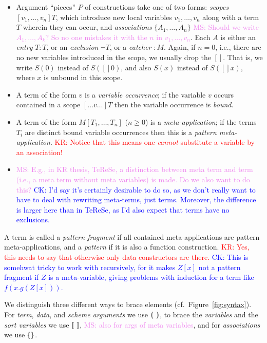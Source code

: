 \documentclass[letterpaper,11pt]{article}
\newcommand{\CK}[1]{\textcolor{blue}{CK: #1}}
\newcommand{\KR}[1]{\textcolor{red}{KR: #1}}
\newcommand{\MS}[1]{\textcolor{violet}{MS: #1}}
\begin{document}
\begin{definition}
\begin{itemize}
  \item Argument ``pieces'' $P$ of constructions take one of two forms: \emph{scopes}
    $[v_1,…,v_n]T$, which introduce new local variables $v_1,…,v_n$ along with a term $T$ wherein
    they can occur, and \emph{associations} $\{A_1,…,A_n\}$ \MS{Should we write $A_1, \ldots, A_k$?
      So no one mistakes it with the $n$ in $v_1, \ldots, v_n$}. Each $A$ is either an \emph{entry}
    $T:T$, or an \emph{exclusion} $¬T$, or a \emph{catcher} ${:}M$. Again, if $n=0$, i.e., there are
    no new variables introduced in the scope, we usually drop the $[]$. That is, we write $S(0)$
    instead of $S([]0)$, and also $S(x)$ instead of $S([]x)$, where $x$ is unbound in this scope.

  \item A term of the form $v$ is a \emph{variable occurrence}; if the variable $v$ occurs contained
    in a scope $[…v…]T$ then the variable occurrence is \emph{bound}.

  \item A term of the form $M[T_1,…,T_n]$ ($n≥0$) is a \emph{meta-application}; if the terms $T_i$
    are distinct bound variable occurrences then this is a \emph{pattern
      meta-application}. \KR{Notice that this means one \emph{cannot} substitute a variable by an
      association!}

  \item  \MS{E.g., in KR thesis, TeReSe, a distinction between meta term and term (i.e., a meta term without
     meta variables) is made. Do we also want to do this?}
     \CK{I'd say it's certainly desirable to do so, as we don't really want to have to
     deal with rewriting meta-terms, just terms.  Moreover, the difference is larger
     here than in TeReSe, as I'd also expect that terms have no exclusions.}
  \end{itemize}
  A term is called a \emph{pattern fragment} if all contained meta-applications are pattern
  meta-applications, and a \emph{pattern} if it is also a function construction. \KR{Yes, this needs
    to say that otherwise only data constructors are there.} \CK{This is somehwat tricky to
    work with recursively, for it makes $Z[x]$ not a pattern fragment if $Z$ is a
    meta-variable, giving problems with induction for a term like $f(x.g(Z[x]))$.}
\end{definition}

We distinguish three different ways to brace elements (cf.\ Figure~\ref{fig:syntax}). For
\emph{term}, \emph{data}, and \emph{scheme arguments} we use $\kw{( )}$, to brace the
\emph{variables} and the \emph{sort variables} we use $\kw{[ ]}$, \MS{also for args of meta
  variables}, and for \emph{associations} we use $\kwm\{ \kwm\}$.
\end{document}
